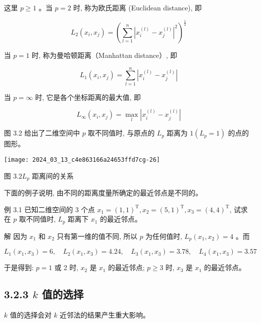 \documentclass[10pt]{article}
\begin{document}
这里 $p \geqslant 1$ 。当 $p=2$ 时, 称为欧氏距离 (Euclidean distance), 即


\begin{equation*}
L_{2}\left(x_{i}, x_{j}\right)=\left(\sum_{l=1}^{n}\left|x_{i}^{(l)}-x_{j}^{(l)}\right|^{2}\right)^{\frac{1}{2}} \tag{3.3}
\end{equation*}


当 $p=1$ 时, 称为曼哈顿距离（Manhattan distance）, 即


\begin{equation*}
L_{1}\left(x_{i}, x_{j}\right)=\sum_{l=1}^{n}\left|x_{i}^{(l)}-x_{j}^{(l)}\right| \tag{3.4}
\end{equation*}


当 $p=\infty$ 时, 它是各个坐标距离的最大值, 即


\begin{equation*}
L_{\infty}\left(x_{i}, x_{j}\right)=\max _{l}\left|x_{i}^{(l)}-x_{j}^{(l)}\right| \tag{3.5}
\end{equation*}


图 3.2 给出了二维空间中 $p$ 取不同值时, 与原点的 $L_{p}$ 距离为 $1\left(L_{p}=1\right)$ 的点的图形。

\begin{center}
\texttt{[image: 2024\_03\_13\_c4e863166a24653ffd7cg-26]}
\end{center}

图 $3.2 L_{p}$ 距离间的关系

下面的例子说明, 由不同的距离度量所确定的最近邻点是不同的。

例 3.1 已知二维空间的 3 个点 $x_{1}=(1,1)^{\mathrm{T}}, x_{2}=(5,1)^{\mathrm{T}}, x_{3}=(4,4)^{\mathrm{T}}$, 试求在 $p$ 取不同值时, $L_{p}$ 距离下 $x_{1}$ 的最近邻点。

解 因为 $x_{1}$ 和 $x_{2}$ 只有第一维的值不同, 所以 $p$ 为任何值时, $L_{p}\left(x_{1}, x_{2}\right)=4$ 。而

$$
L_{1}\left(x_{1}, x_{3}\right)=6, \quad L_{2}\left(x_{1}, x_{3}\right)=4.24, \quad L_{3}\left(x_{1}, x_{3}\right)=3.78, \quad L_{4}\left(x_{1}, x_{3}\right)=3.57
$$

于是得到: $p=1$ 或 2 时, $x_{2}$ 是 $x_{1}$ 的最近邻点; $p \geqslant 3$ 时, $x_{3}$ 是 $x_{1}$ 的最近邻点。

\subsection*{3.2.3 $k$ 值的选择}
$k$ 值的选择会对 $k$ 近邻法的结果产生重大影响。
\end{document}
